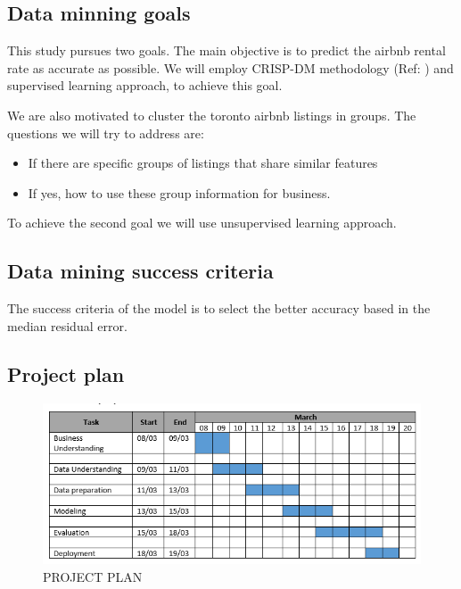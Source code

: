 \hypertarget{data-minning-goals}{%
\subsection{Data minning goals}\label{data-minning-goals}}

This study pursues two goals. The main objective is to predict the
airbnb rental rate as accurate as possible. We will employ CRISP-DM
methodology (Ref: \cite{mining}) and supervised learning approach, to
achieve this goal.

We are also motivated to cluster the toronto airbnb listings in groups.
The questions we will try to address are:

\begin{itemize}
\tightlist
\item
  If there are specific groups of listings that share similar features
\item
  If yes, how to use these group information for business.
\end{itemize}

To achieve the second goal we will use unsupervised learning approach.

\hypertarget{data-mining-success-criteria}{%
\subsection{Data mining success
criteria}\label{data-mining-success-criteria}}

The success criteria of the model is to select the better accuracy based
in the median residual error.

\hypertarget{project-plan}{%
\subsection{Project plan}\label{project-plan}}

\begin{figure}
\centering
\includegraphics{Project Plan.PNG}
\caption{PROJECT PLAN}
\end{figure}

